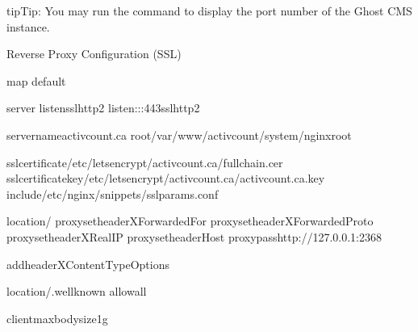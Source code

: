 \documentclass[letterpaper,10pt,english]{sphinxmanual}
\begin{document}
\begin{sphinxadmonition}{tip}{Tip:}
\sphinxAtStartPar
You may run the command  to display the port number of the Ghost CMS instance.
\end{sphinxadmonition}

\sphinxAtStartPar
Reverse Proxy Configuration (SSL)

\begin{sphinxVerbatim}[commandchars=\\\{\}]
map
default

server
listensslhttp2
listen\PYG{o}{[}::\PYG{o}{]}:443sslhttp2

server\PYGZus{}nameactivcount.ca
root/var/www/activcount/system/nginx\PYGZhy{}root

ssl\PYGZus{}certificate/etc/letsencrypt/activcount.ca/fullchain.cer
ssl\PYGZus{}certificate\PYGZus{}key/etc/letsencrypt/activcount.ca/activcount.ca.key
include/etc/nginx/snippets/ssl\PYGZhy{}params.conf

location/
proxy\PYGZus{}set\PYGZus{}headerX\PYGZhy{}Forwarded\PYGZhy{}For
proxy\PYGZus{}set\PYGZus{}headerX\PYGZhy{}Forwarded\PYGZhy{}Proto
proxy\PYGZus{}set\PYGZus{}headerX\PYGZhy{}Real\PYGZhy{}IP
proxy\PYGZus{}set\PYGZus{}headerHost
proxy\PYGZus{}passhttp://127.0.0.1:2368

add\PYGZus{}headerX\PYGZhy{}Content\PYGZhy{}Type\PYGZhy{}Options

location\PYGZti{}/.well\PYGZhy{}known
allowall

client\PYGZus{}max\PYGZus{}body\PYGZus{}size1g
\end{sphinxVerbatim}
\end{document}
